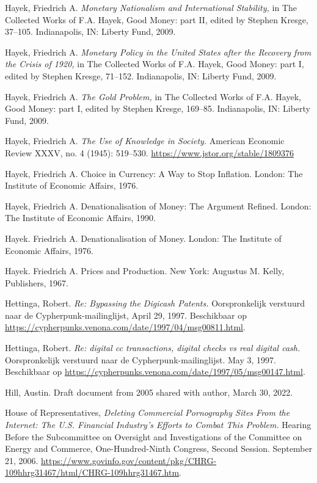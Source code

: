 \documentclass[
  a5paper,
  smalldemyvopaper,11pt,twoside,onecolumn,openright,extrafontsizes,
hidelinks]{memoir}
\begin{document}
Hayek, Friedrich A. \emph{Monetary Nationalism and International
Stability,} in The Collected Works of F.A. Hayek, Good Money: part II,
edited by Stephen Kresge, 37--105. Indianapolis, IN: Liberty Fund, 2009.

Hayek, Friedrich A. \emph{Monetary Policy in the United States after the
Recovery from the Crisis of 1920,} in The Collected Works of F.A. Hayek,
Good Money: part I, edited by Stephen Kresge, 71--152. Indianapolis, IN:
Liberty Fund, 2009.

Hayek, Friedrich A. \emph{The Gold Problem,} in The Collected Works of
F.A. Hayek, Good Money: part I, edited by Stephen Kresge, 169--85.
Indianapolis, IN: Liberty Fund, 2009.

Hayek, Friedrich A. \emph{The Use of Knowledge in Society.} American
Economic Review XXXV, no. 4 (1945): 519--530.
\url{https://www.jstor.org/stable/1809376}

Hayek, Friedrich A. Choice in Currency: A Way to Stop Inflation. London:
The Institute of Economic Affairs, 1976.

Hayek, Friedrich A. Denationalisation of Money: The Argument Refined.
London: The Institute of Economic Affairs, 1990.

Hayek. Friedrich A. Denationalisation of Money. London: The Institute of
Economic Affairs, 1976.

Hayek. Friedrich A. Prices and Production. New York: Augustus M. Kelly,
Publishers, 1967.

Hettinga, Robert. \emph{Re: Bypassing the Digicash Patents.}
Oorspronkelijk verstuurd naar de Cypherpunk-mailinglijst, April 29,
1997. Beschikbaar op
\url{https://cypherpunks.venona.com/date/1997/04/msg00811.html}.

Hettinga, Robert. \emph{Re: digital cc transactions, digital checks vs
real digital cash.} Oorspronkelijk verstuurd naar de
Cypherpunk-mailinglijst. May 3, 1997. Beschikbaar op
\url{https://cypherpunks.venona.com/date/1997/05/msg00147.html}.

Hill, Austin. Draft document from 2005 shared with author, March 30,
2022.

House of Representatives, \emph{Deleting Commercial Pornography Sites
From the Internet: The U.S. Financial Industry's Efforts to Combat This
Problem.} Hearing Before the Subcommittee on Oversight and
Investigations of the Committee on Energy and Commerce,
One-Hundred-Ninth Congress, Second Session. September 21, 2006.
\url{https://www.govinfo.gov/content/pkg/CHRG-109hhrg31467/html/CHRG-109hhrg31467.htm}.
\end{document}

